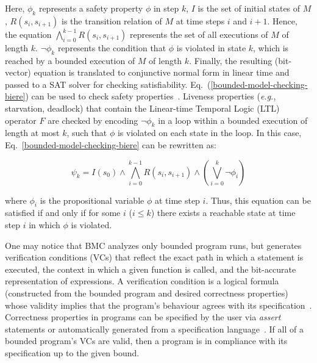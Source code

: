 \documentclass[format=acmsmall, review=false, screen=true]{acmart}
\begin{document}
\noindent Here, $\phi_{k}$ represents a safety property $\phi$ in step $k$, $I$ is the set of initial states of $M$, $R\left(s_{i},s_{i+1}\right)$ is the transition relation of $M$ at time steps $i$ and $i+1$. Hence, the equation $\bigwedge^{k-1}_{i=0} R\left(s_{i},s_{i+1}\right)$ represents the set of all executions of $M$ of length $k$. $\neg \phi_{k}$ represents the condition that $\phi$ is violated in state $k$, which is reached by a bounded execution of $M$ of length $k$. Finally, the resulting (bit-vector) equation is translated to conjunctive normal form in linear time and passed to a SAT solver for checking satisfiability. Eq.~(\ref{bounded-model-checking-biere}) can be used to check safety properties~\cite{PrasadBG05}. Liveness properties ({\it e.g.}, starvation, deadlock) that contain the Linear-time Temporal Logic (LTL) operator $F$ are checked by encoding $\neg \phi_{k}$ in a loop within a bounded execution of length at most $k$, such that $\phi$ is violated on each state in the loop. In this case, Eq.~\ref{bounded-model-checking-biere} can be rewritten as:

%
\begin{equation}
\psi_{k} = I\left(s_{0}\right) \wedge \bigwedge^{k-1}_{i=0} R\left(s_{i},s_{i+1}\right) \wedge \left(\bigvee^{k}_{i=0} \neg \phi_{i}\right)
\end{equation}

\noindent where $\phi_{i}$ is the propositional variable $\phi$ at time step $i$. Thus, this equation can be satisfied if and only if for some $i$ ($i \leq k$) there exists a reachable state at time step $i$ in which $\phi$ is violated. 

One may notice that BMC analyzes only bounded program runs, but generates verification conditions (VCs) that reflect the exact path in which a statement is executed, the context in which a given function is called, and the bit-accurate representation of expressions. A verification condition is a logical formula (constructed from the bounded program and desired correctness properties) whose validity implies that the program's behaviour agrees with its specification~\cite{Bradley07}. Correctness properties in programs can be specified by the user via \textit{assert} statements or automatically generated from a specification language~\cite{Thomas01}. If all of a bounded program's VCs are valid, then a program is in compliance with its specification up to the given bound.
\end{document}
